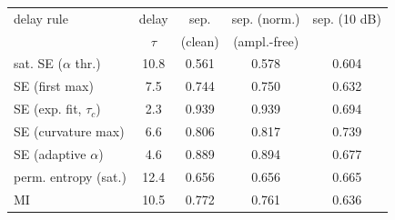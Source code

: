 \begin{tabular}{lcccc}
\toprule
delay rule & delay & sep. & sep. (norm.) & sep. (10 dB) \\
 & $\tau$ & (clean) & (ampl.-free) & \\
\midrule
sat. SE ($\alpha$ thr.) & 10.8 & 0.561 & 0.578 & 0.604 \\
SE (first max) & 7.5 & 0.744 & 0.750 & 0.632 \\
SE (exp. fit, $\tau_c$) & 2.3 & 0.939 & 0.939 & 0.694 \\
SE (curvature max) & 6.6 & 0.806 & 0.817 & 0.739 \\
SE (adaptive $\alpha$) & 4.6 & 0.889 & 0.894 & 0.677 \\
perm. entropy (sat.) & 12.4 & 0.656 & 0.656 & 0.665 \\
MI & 10.5 & 0.772 & 0.761 & 0.636 \\
\bottomrule
\end{tabular}
